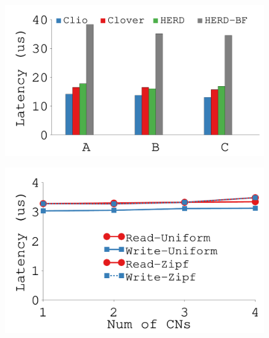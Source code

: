 {\begin{figure}[th]
\begin{minipage}{\figWidthSix}
\begin{center}
\centerline{\includegraphics[width=\columnwidth]{Figures/g_plot_ycsb_cn.pdf}}
\vspace{-0.1in}
\captionsetup{width=.9\columnwidth}
{
}
\end{center}
\end{minipage}
\begin{minipage}{\figWidthSix}
\begin{center}
\centerline{\includegraphics[width=\columnwidth]{Figures/g_plot_mvstore.pdf}}
\vspace{-0.1in}
\captionsetup{width=.9\columnwidth}
{
}
\end{center}
\end{minipage}
\end{figure}
}